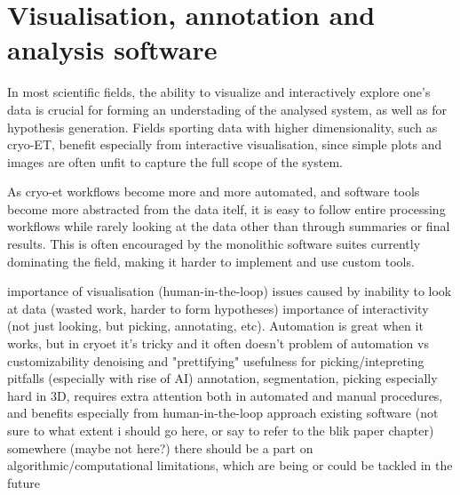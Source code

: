 \chapter{Visualisation, annotation and analysis software}

In most scientific fields, the ability to visualize and interactively explore one's data is crucial for forming an understading of the analysed system, as well as for hypothesis generation.
Fields sporting data with higher dimensionality, such as cryo-ET, benefit especially from interactive visualisation, since simple plots and images are often unfit to capture the full scope of the system.

As cryo-et workflows become more and more automated, and software tools become more abstracted from the data itelf, it is easy to follow entire processing workflows while rarely looking at the data other than through summaries or final results.
This is often encouraged by the monolithic software suites currently dominating the field, making it harder to implement and use custom tools.

\begin{outline}
\1 importance of visualisation (human-in-the-loop)
    \2 issues caused by inability to look at data (wasted work, harder to form hypotheses)
    \2 importance of interactivity (not just looking, but picking, annotating, etc). Automation is great when it works, but in cryoet it's tricky and it often doesn't
        \3 problem of automation vs customizability
\1 denoising and "prettifying"
    \2 usefulness for picking/intepreting
    \2 pitfalls (especially with rise of AI)
\1 annotation, segmentation, picking
    \2 especially hard in 3D, requires extra attention both in automated and manual procedures, and benefits especially from human-in-the-loop approach
    \2 existing software (not sure to what extent i should go here, or say to refer to the blik paper chapter)
\1 somewhere (maybe not here?) there should be a part on algorithmic/computational limitations, which are being or could be tackled in the future
\end{outline}
